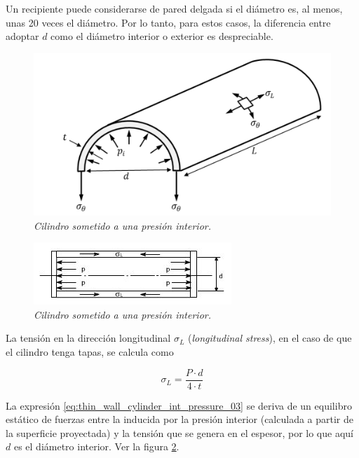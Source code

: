 Un recipiente puede considerarse de pared delgada si el diámetro es, al menos, unas 20 veces el diámetro. Por lo tanto, para estos casos, la diferencia entre adoptar $d$ como el diámetro interior o exterior es despreciable.

\begin{figure}[ht]
     \centerline{\includegraphics[scale=0.6]{thin_wall_cylinder_int_pressure_01.png}}
     \caption{\textit{Cilindro sometido a una presión interior.}}
     \label{im:thin_wall_cylinder_int_pressure_01}
\end{figure}

\begin{figure}[ht]
     \centerline{\includegraphics[scale=0.8]{thin_wall_cylinder_int_pressure_02.jpeg}}
     \caption{\textit{Cilindro sometido a una presión interior.}}
     \label{im:thin_wall_cylinder_int_pressure_02}
\end{figure}

La tensión en la dirección longitudinal $\sigma_L$ (\textit{longitudinal stress}), en el caso de que el cilindro tenga tapas, se calcula como

\begin{equation}
     \sigma_L=\frac{P \cdot d}{4 \cdot t}
     \label{eq:thin_wall_cylinder_int_pressure_03}
\end{equation}

La expresión \ref{eq:thin_wall_cylinder_int_pressure_03} se deriva de un equilibro estático de fuerzas entre la inducida por la presión interior (calculada a partir de la superficie proyectada) y la tensión que se genera en el espesor, por lo que aquí $d$ es el diámetro interior. Ver la figura \ref{im:thin_wall_cylinder_int_pressure_02}.


